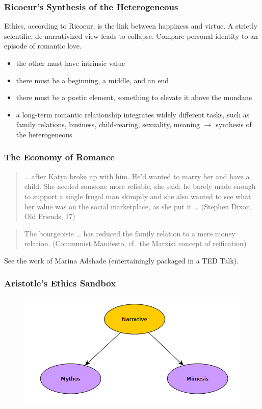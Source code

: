 \documentclass[xcolor=dvipsnames]{beamer}
\begin{document}
\begin{frame}
  \frametitle{Ricoeur's Synthesis of the Heterogeneous}
  Ethics, according to Ricoeur, is the link between happiness and
  virtue. A strictly scientific, de-narrativized view leads to
  collapse. Compare personal identity to an episode of romantic love.
  \begin{itemize}
  \item the other must have intrinsic value
  \item there must be a beginning, a middle, and an end
  \item there must be a poetic element, something to elevate it above
    the mundane
  \item a long-term romantic relationship integrates widely different
    tasks, such as family relations, business, child-rearing,
    sexuality, meaning $\longrightarrow$ synthesis of the heterogeneous
  \end{itemize}
\end{frame}

\begin{frame}
  \frametitle{The Economy of Romance}
  \begin{quote}
    {\ldots} after Katya broke up with him. He'd wanted to marry her
    and have a child. She needed someone more reliable, she said; he
    barely made enough to support a single frugal man skimpily and she
    also wanted to see what her value was on the social marketplace,
    as she put it {\ldots} (Stephen Dixon, Old Friends, 17)
  \end{quote}
  \begin{quote}
    The bourgeoisie {\ldots} has reduced the family relation to a mere
    money relation. (Communist Manifesto, cf.\ the Marxist concept of
    reification)
  \end{quote}
  See the work of Marina Adshade (entertainingly packaged in a TED
  Talk).
\end{frame}

\begin{frame}
  \frametitle{Aristotle's Ethics Sandbox}
  \begin{figure}[h]
    \includegraphics[scale=0.5]{./mythos.png}
  \end{figure}
\end{frame}
\end{document}

